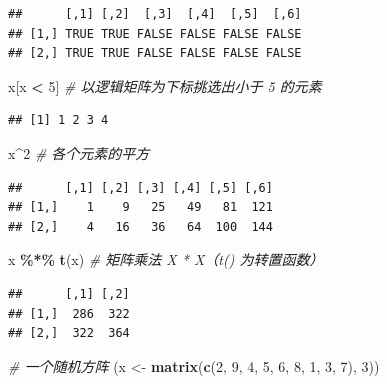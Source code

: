 \documentclass[
  b5paper,
  UTF8,twoside]{book}
\newenvironment{Shaded}{\begin{snugshade}}{\end{snugshade}}
\newcommand{\CommentTok}[1]{\textcolor[rgb]{0.56,0.35,0.01}{\textit{#1}}}
\newcommand{\DecValTok}[1]{\textcolor[rgb]{0.00,0.00,0.81}{#1}}
\newcommand{\FunctionTok}[1]{\textcolor[rgb]{0.13,0.29,0.53}{\textbf{#1}}}
\newcommand{\NormalTok}[1]{#1}
\newcommand{\OtherTok}[1]{\textcolor[rgb]{0.56,0.35,0.01}{#1}}
\newcommand{\SpecialCharTok}[1]{\textcolor[rgb]{0.81,0.36,0.00}{\textbf{#1}}}
\begin{document}
\begin{verbatim}
##      [,1] [,2]  [,3]  [,4]  [,5]  [,6]
## [1,] TRUE TRUE FALSE FALSE FALSE FALSE
## [2,] TRUE TRUE FALSE FALSE FALSE FALSE
\end{verbatim}

\begin{Shaded}
\begin{Highlighting}[]
\NormalTok{x[x }\SpecialCharTok{\textless{}} \DecValTok{5}\NormalTok{] }\CommentTok{\# 以逻辑矩阵为下标挑选出小于 5 的元素}
\end{Highlighting}
\end{Shaded}

\begin{verbatim}
## [1] 1 2 3 4
\end{verbatim}

\begin{Shaded}
\begin{Highlighting}[]
\NormalTok{x}\SpecialCharTok{\^{}}\DecValTok{2} \CommentTok{\# 各个元素的平方}
\end{Highlighting}
\end{Shaded}

\begin{verbatim}
##      [,1] [,2] [,3] [,4] [,5] [,6]
## [1,]    1    9   25   49   81  121
## [2,]    4   16   36   64  100  144
\end{verbatim}

\begin{Shaded}
\begin{Highlighting}[]
\NormalTok{x }\SpecialCharTok{\%*\%} \FunctionTok{t}\NormalTok{(x) }\CommentTok{\# 矩阵乘法 X * X\textquotesingle{}（t() 为转置函数）}
\end{Highlighting}
\end{Shaded}

\begin{verbatim}
##      [,1] [,2]
## [1,]  286  322
## [2,]  322  364
\end{verbatim}

\begin{Shaded}
\begin{Highlighting}[]
\CommentTok{\# 一个随机方阵}
\NormalTok{(x }\OtherTok{\textless{}{-}} \FunctionTok{matrix}\NormalTok{(}\FunctionTok{c}\NormalTok{(}\DecValTok{2}\NormalTok{, }\DecValTok{9}\NormalTok{, }\DecValTok{4}\NormalTok{, }\DecValTok{5}\NormalTok{, }\DecValTok{6}\NormalTok{, }\DecValTok{8}\NormalTok{, }\DecValTok{1}\NormalTok{, }\DecValTok{3}\NormalTok{, }\DecValTok{7}\NormalTok{), }\DecValTok{3}\NormalTok{))}
\end{Highlighting}
\end{Shaded}
\end{document}
